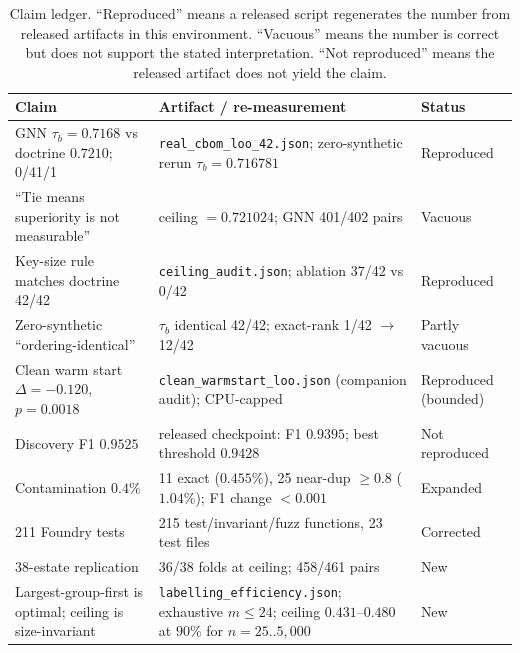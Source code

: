 \documentclass[journal,10pt]{IEEEtran}
\newcommand{\tb}{\tau_b}
\begin{document}
\begin{table}[t]
\centering
\caption{Claim ledger. ``Reproduced'' means a released script regenerates the number from released
artifacts in this environment. ``Vacuous'' means the number is correct but does not support the
stated interpretation. ``Not reproduced'' means the released artifact does not yield the claim.}
\label{tab:ledger}
\footnotesize
\begin{tabular}{@{}p{2.05in}p{2.45in}p{0.95in}@{}}
\toprule
Claim & Artifact / re-measurement & Status \\
\midrule
GNN $\tb=0.7168$ vs doctrine $0.7210$; 0/41/1 & \texttt{real\_cbom\_loo\_42.json}; zero-synthetic rerun $\tb=0.716781$ & Reproduced \\
``Tie means superiority is not measurable'' & ceiling $=0.721024$; GNN 401/402 pairs & Vacuous \\
Key-size rule matches doctrine 42/42 & \texttt{ceiling\_audit.json}; ablation 37/42 vs 0/42 & Reproduced \\
Zero-synthetic ``ordering-identical'' & $\tb$ identical 42/42; exact-rank 1/42 $\rightarrow$ 12/42 & Partly vacuous \\
Clean warm start $\Delta=-0.120$, $p=0.0018$ & \texttt{clean\_warmstart\_loo.json} (companion audit); CPU-capped & Reproduced (bounded) \\
Discovery F1 $0.9525$ & released checkpoint: F1 $0.9395$; best threshold $0.9428$ & Not reproduced \\
Contamination $0.4\%$ & 11 exact ($0.455\%$), 25 near-dup $\ge0.8$ ($1.04\%$); F1 change $<0.001$ & Expanded \\
211 Foundry tests & 215 test/invariant/fuzz functions, 23 test files & Corrected \\
38-estate replication & 36/38 folds at ceiling; 458/461 pairs & New \\
Largest-group-first is optimal; ceiling is size-invariant & \texttt{labelling\_efficiency.json}; exhaustive $m\le24$; ceiling $0.431$--$0.480$ at $90\%$ for $n=25..5{,}000$ & New \\
\bottomrule
\end{tabular}
\end{table}
\end{document}
